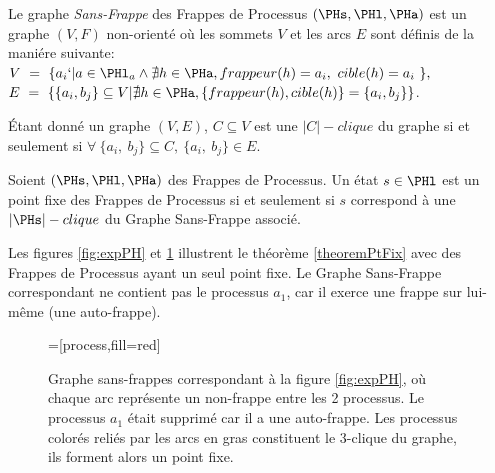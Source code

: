 \begin{definition} 
Le graphe \textit{Sans-Frappe} des Frappes de Processus $(\PHs,\PHl,\PHa)$ est un graphe $(V,F)$ non-orienté où les sommets $V$ et les arcs $E$ sont définis de la maniére suivante: \\
$V ~ = ~ \{ a_{i} `| a \in \PHl_{a} \land \nexists h \in \PHa, frappeur(h)=a_{i}, ~ cible(h)=a_{i} ~ \},$ \\
$E ~ = ~ \{ \{ a_{i}, b_{j} \} \subseteq V | \nexists h \in \PHa, \{ frappeur(h), cible(h)\}=\{a_{i}, b_{j}\} \}$.
\label{defGrapheSansFrappes}
\end{definition}

\begin{definition}[n-clique]
Étant donné un graphe $(V,E)$, $C \subseteq V$ est une $|C|-clique$ du graphe si et seulement si $\forall ~ \{a_i, ~ b_j\} \subseteq C, ~ \{a_i, ~ b_j\} \in E$.
\label{defNclique}
\end{definition}

\begin{theorem}
Soient $(\PHs,\PHl,\PHa)$ des Frappes de Processus. Un état $s \in \PHl$ est un point fixe des Frappes de Processus si et seulement si $s$ correspond à une $|\PHs|-clique$ du Graphe Sans-Frappe
associé.
\label{theoremPtFix}
\end{theorem}

Les figures \ref{fig:expPH} et \ref{fig:fixPointGrapheSansFrappes} illustrent le théorème \ref{theoremPtFix} avec des Frappes de Processus ayant un seul point fixe. Le Graphe Sans-Frappe correspondant ne contient pas le processus $a_1$, car il exerce une frappe sur lui-même (une auto-frappe).

\begin{figure}[ht]
\centering
{}=[process,fill=red]
\caption{\label{fig:fixPointGrapheSansFrappes}
Graphe sans-frappes correspondant à la figure \ref{fig:expPH}, où chaque arc représente un non-frappe entre les 2 processus. Le processus $a_{1}$ était supprimé car il a une auto-frappe. Les processus colorés reliés par les arcs en gras constituent le 3-clique du graphe, ils forment alors un point fixe.
}
\end{figure}

